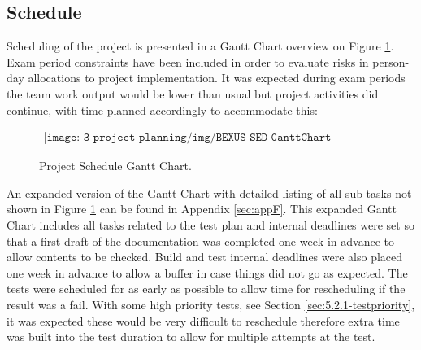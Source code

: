 \subsection{Schedule}

Scheduling of the project is presented in a Gantt Chart overview on Figure \ref{fig:schedule-gantt-chart}. Exam period constraints have been included in order to evaluate risks in person-day allocations to project implementation. It was expected during exam periods the team work output would be lower than usual but project activities did continue, with time planned accordingly to accommodate this:

\begin{figure}[H]
    \begin{align*}
        \texttt{[image: 3-project-planning/img/BEXUS-SED-GanttChart-Overview.png]}
    \end{align*}
    \caption{Project Schedule Gantt Chart.}\label{fig:schedule-gantt-chart}
\end{figure}

An expanded version of the Gantt Chart with detailed listing of all sub-tasks not shown in Figure \ref{fig:schedule-gantt-chart} can be found in Appendix \ref{sec:appF}. This expanded Gantt Chart includes all tasks related to the test plan and internal deadlines were set so that a first draft of the documentation was completed one week in advance to allow contents to be checked. Build and test internal deadlines were also placed one week in advance to allow a buffer in case things did not go as expected. The tests were scheduled for as early as possible to allow time for rescheduling if the result was a fail. With some high priority tests, see Section \ref{sec:5.2.1-testpriority}, it was expected these would be very difficult to reschedule therefore extra time was built into the test duration to allow for multiple attempts at the test.

